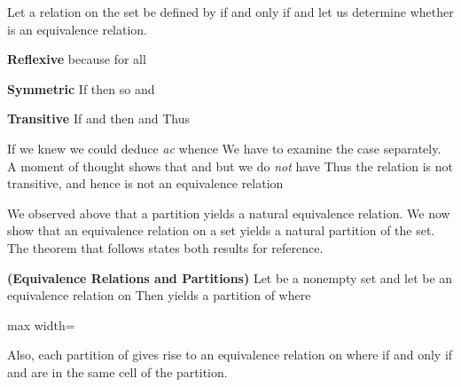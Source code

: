 \documentclass[11pt,oneside]{article}
\begin{document}
\begin{BookBody}

 Let a relation  on the set  be defined by  if and only if  and let us determine whether  is an equivalence relation.

\textbf{Reflexive}  because  for all 

\textbf{Symmetric} If  then  so  and 

\textbf{Transitive} If  and  then  and  Thus 

If we knew  we could deduce\textit{ ac}  whence  We have to examine the case  separately. A moment of thought shows that  and  but we do\textit{ not} have  Thus the relation  is not transitive, and hence is not an equivalence relation\BookEnd{\blacktriangle}

We observed above that a partition yields a natural equivalence relation. We now show that an equivalence relation on a set yields a natural partition of the set. The theorem that follows states both results for reference.

 \textbf{(Equivalence Relations and Partitions)} Let  be a nonempty set and let \BookInline{\sim } be an equivalence relation on  Then \BookInline{\sim } yields a partition of  where

\begin{center}\begin{adjustbox}{max width=\linewidth}\end{adjustbox}\end{center}

\noindent Also, each partition of  gives rise to an equivalence relation \BookInline{\sim } on  where  if and only if  and  are in the same cell of the partition.


\end{BookBody}
\end{document}

